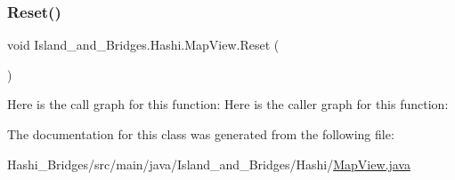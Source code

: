 \subsubsection{\texorpdfstring{Reset()}{Reset()}}
{\footnotesize\ttfamily void Island\+\_\+and\+\_\+\+Bridges.\+Hashi.\+Map\+View.\+Reset (\begin{DoxyParamCaption}{ }\end{DoxyParamCaption})}

Here is the call graph for this function\+:
Here is the caller graph for this function\+:


The documentation for this class was generated from the following file\+:\begin{DoxyCompactItemize}
\item 
Hashi\+\_\+\+Bridges/src/main/java/\+Island\+\_\+and\+\_\+\+Bridges/\+Hashi/\mbox{\hyperlink{_map_view_8java}{Map\+View.\+java}}\end{DoxyCompactItemize}
